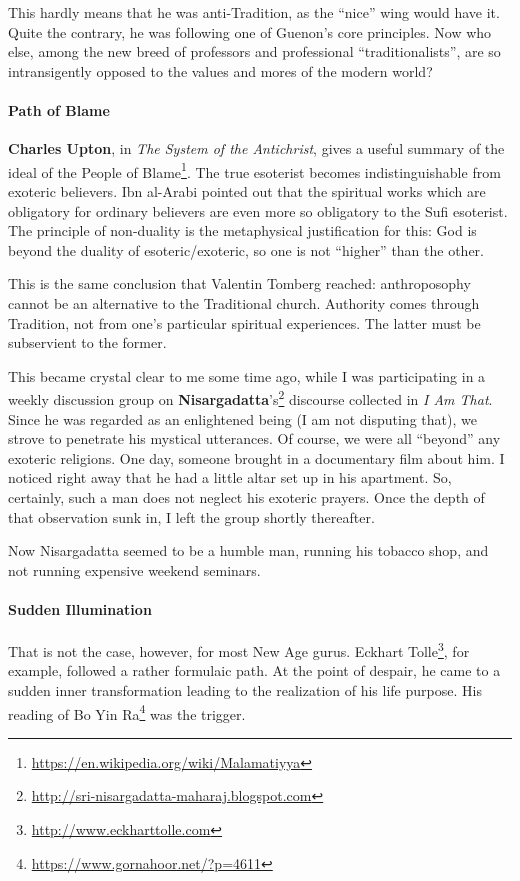 This hardly means that he was anti-Tradition, as the ``nice'' wing would have it. Quite the contrary, he was following one of Guenon's core principles. Now who else, among the new breed of professors and professional ``traditionalists'', are so intransigently opposed to the values and mores of the modern world?

\paragraph{Path of Blame}


\textbf{Charles Upton}, in \emph{The System of the Antichrist}, gives a useful summary of the ideal of the People of Blame\footnote{\url{https://en.wikipedia.org/wiki/Malamatiyya}}. The true esoterist becomes indistinguishable from exoteric believers. Ibn al-Arabi pointed out that the spiritual works which are obligatory for ordinary believers are even more so obligatory to the Sufi esoterist. The principle of non-duality is the metaphysical justification for this: God is beyond the duality of esoteric/exoteric, so one is not ``higher'' than the other.

This is the same conclusion that Valentin Tomberg reached: anthroposophy cannot be an alternative to the Traditional church. Authority comes through Tradition, not from one's particular spiritual experiences. The latter must be subservient to the former.

This became crystal clear to me some time ago, while I was participating in a weekly discussion group on \textbf{Nisargadatta}'s\footnote{\url{http://sri-nisargadatta-maharaj.blogspot.com}} discourse collected in \emph{I Am That}. Since he was regarded as an enlightened being (I am not disputing that), we strove to penetrate his mystical utterances. Of course, we were all ``beyond'' any exoteric religions. One day, someone brought in a documentary film about him. I noticed right away that he had a little altar set up in his apartment. So, certainly, such a man does not neglect his exoteric prayers. Once the depth of that observation sunk in, I left the group shortly thereafter.

Now Nisargadatta seemed to be a humble man, running his tobacco shop, and not running expensive weekend seminars.

\paragraph{Sudden Illumination}


That is not the case, however, for most New Age gurus. Eckhart Tolle\footnote{\url{http://www.eckharttolle.com}}, for example, followed a rather formulaic path. At the point of despair, he came to a sudden inner transformation leading to the realization of his life purpose. His reading of Bo Yin Ra\footnote{\url{https://www.gornahoor.net/?p=4611}} was the trigger.

